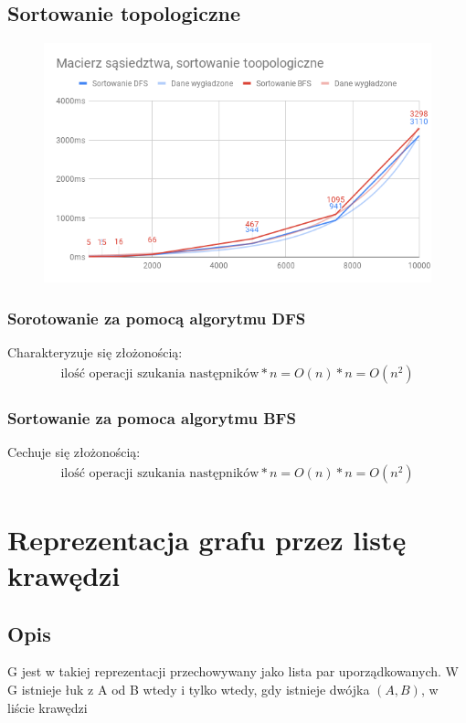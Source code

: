 \documentclass[]{article}
\begin{document}
	\subsection{Sortowanie topologiczne}
		\begin{figure}[H]
			\includegraphics[scale=0.6]{adjacency_matrix.png}
		\end{figure}
		\subsubsection{Sorotowanie za pomocą algorytmu DFS}
			Charakteryzuje się złożonością:
			\begin{multline}
				\text{ilość operacji szukania następników} * n = O(n) * n = O(n^2)
			\end{multline}
		\subsubsection{Sortowanie za pomoca algorytmu BFS}
			Cechuje się złożonością:
			\begin{multline}
				\text{ilość operacji szukania następników} * n = O(n) * n = O(n^2)
			\end{multline}
\clearpage
			
\section{Reprezentacja grafu przez listę krawędzi}
	\subsection{Opis}
		\gls{G} jest w takiej reprezentacji przechowywany jako lista par uporządkowanych. W \gls{G} istnieje łuk z \gls{A} od \gls{B} wtedy i tylko wtedy, gdy istnieje dwójka $(A, B)$, w liście krawędzi
		
\end{document}
